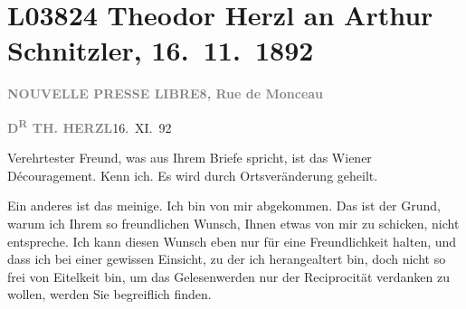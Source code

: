 

\section[Theodor Herzl an Arthur Schnitzler, 16. 11. 1892]{L03824 Theodor Herzl an Arthur Schnitzler, 16. 11. 1892}
\nopagebreak{}
\rehead{ }\normalsize\beginnumbering{}
\toendnotes[C]{\smallbreak\pagebreak[2]}
\toendnotes[C]{\smallbreak}
\pstart
           {\pb}\textcolor{gray}{\textbf{NOUVELLE PRESSE LIBRE}}\hfill \textcolor{gray}{\textbf{8, Rue de Monceau
                  }}\pend
           
\pstart
           \textcolor{gray}{\textbf{D\textsuperscript{R} TH. HERZL}}\hfill 16. XI. 92\pend
           
\pstart{}Verehrtester Freund,\pend\vspace{0.5em}
\pstart
           was aus Ihrem Briefe spricht,
               ist das Wiener Découragement.
      Kenn ich. Es wird durch Ortsveränderung
      geheilt.
      \pend
           
\pstart
           Ein anderes ist das meinige.
      Ich bin von mir abgekommen.
      Das ist der Grund, warum ich
      Ihrem so freundlichen Wunsch,
      Ihnen etwas von mir zu schicken,
      nicht entspreche. Ich kann diesen
      Wunsch eben nur für eine
      Freundlichkeit halten, und dass
      ich bei einer gewissen Einsicht,
      zu der ich herangealtert bin,
      doch nicht so frei von Eitelkeit
      bin, um das Gelesenwerden nur
                  {\pb}der Reciprocität verdanken zu
      wollen, werden Sie begreiflich
      finden.\pend
           
